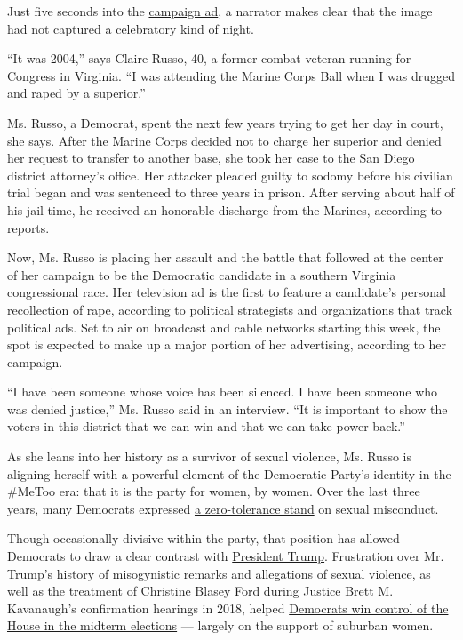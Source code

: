 Just five seconds into the
\href{https://www.youtube.com/watch?v=pIWsBSGtDF8\&feature=emb_title}{campaign
ad}, a narrator makes clear that the image had not captured a
celebratory kind of night.

``It was 2004,'' says Claire Russo, 40, a former combat veteran running
for Congress in Virginia. ``I was attending the Marine Corps Ball when I
was drugged and raped by a superior.''

Ms. Russo, a Democrat, spent the next few years trying to get her day in
court, she says. After the Marine Corps decided not to charge her
superior and denied her request to transfer to another base, she took
her case to the San Diego district attorney's office. Her attacker
pleaded guilty to sodomy before his civilian trial began and was
sentenced to three years in prison. After serving about half of his jail
time, he received an honorable discharge from the Marines, according to
reports.

Now, Ms. Russo is placing her assault and the battle that followed at
the center of her campaign to be the Democratic candidate in a southern
Virginia congressional race. Her television ad is the first to feature a
candidate's personal recollection of rape, according to political
strategists and organizations that track political ads. Set to air on
broadcast and cable networks starting this week, the spot is expected to
make up a major portion of her advertising, according to her campaign.

``I have been someone whose voice has been silenced. I have been someone
who was denied justice,'' Ms. Russo said in an interview. ``It is
important to show the voters in this district that we can win and that
we can take power back.''

As she leans into her history as a survivor of sexual violence, Ms.
Russo is aligning herself with a powerful element of the Democratic
Party's identity in the \#MeToo era: that it is the party for women, by
women. Over the last three years, many Democrats expressed
\href{https://www.nytimes3xbfgragh.onion/2019/02/03/us/politics/democrats-race-virginia.html}{a
zero-tolerance stand} on sexual misconduct.

Though occasionally divisive within the party, that position has allowed
Democrats to draw a clear contrast with
\href{https://www.nytimes3xbfgragh.onion/interactive/2020/us/elections/donald-trump.html}{President
Trump}. Frustration over Mr. Trump's history of misogynistic remarks and
allegations of sexual violence, as well as the treatment of Christine
Blasey Ford during Justice Brett M. Kavanaugh's confirmation hearings in
2018, helped
\href{https://www.nytimes3xbfgragh.onion/2018/11/06/us/politics/women-midterms-historic.html}{Democrats
win control of the House in the midterm elections} --- largely on the
support of suburban women.

